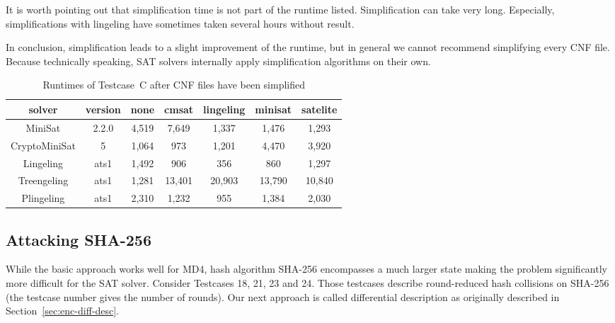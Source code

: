 It is worth pointing out that simplification time is not part of the runtime
listed. Simplification can take very long. Especially, simplifications with
lingeling have sometimes taken several hours without result.

In conclusion, simplification leads to a slight improvement of the runtime,
but in general we cannot recommend simplifying every CNF file.
Because technically speaking, SAT solvers internally apply simplification
algorithms on their own.

\begin{table}[!h]
  \begin{center}
    \begin{tabular}{cc|ccccc}
      \textbf{solver} & \textbf{version} & \textbf{none} & \textbf{cmsat} & \textbf{lingeling} & \textbf{minisat} & \textbf{satelite} \\
    \hline
      MiniSat       & 2.2.0              & 4,519    & 7,649    & 1,337    & 1,476    & 1,293 \\
      CryptoMiniSat & 5                  & 1,064    & 973      & 1,201    & 4,470    & 3,920 \\
      Lingeling     & ats1               & 1,492    & 906      & 356      & 860      & 1,297 \\
      Treengeling   & ats1               & 1,281    & 13,401   & 20,903   & 13,790   & 10,840 \\
      Plingeling    & ats1               & 2,310    & 1,232    & 955      & 1,384    & 2,030
    \end{tabular}
    \caption{
      Runtimes of Testcase~C after CNF files have been simplified
    }
    \label{tab:simplification-results}
  \end{center}
\end{table}

\subsection{Attacking SHA-256}
\label{sec:result-diff-desc}
%
While the basic approach works well for MD4, hash algorithm SHA-256 encompasses
a much larger state making the problem significantly more difficult for the SAT solver.
Consider Testcases 18, 21, 23 and 24. Those testcases describe
round-reduced hash collisions on SHA-256 (the testcase number gives
the number of rounds). Our next approach is called differential description
as originally described in Section~\ref{sec:enc-diff-desc}. 

